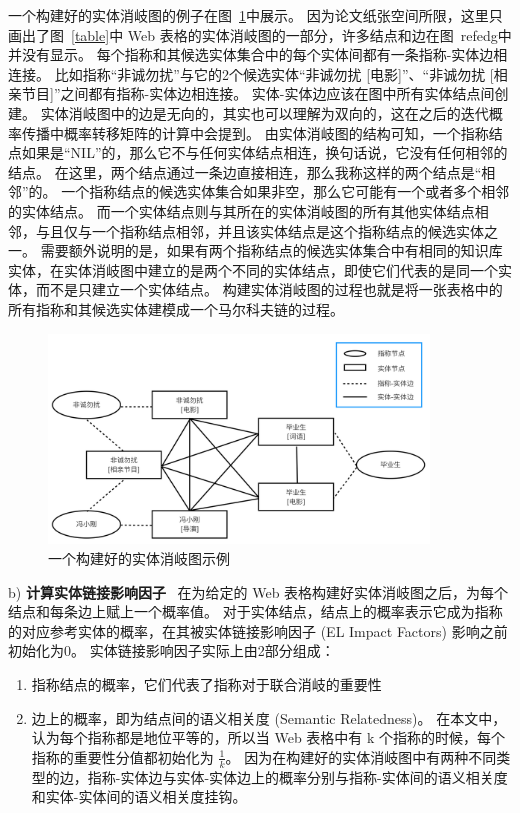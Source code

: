 一个构建好的实体消岐图的例子在图~\ref{edg}中展示。
因为论文纸张空间所限，这里只画出了图~\ref{table}中 Web 表格的实体消岐图的一部分，许多结点和边在图~ref{edg}中并没有显示。
每个指称和其候选实体集合中的每个实体间都有一条指称-实体边相连接。
比如指称``非诚勿扰''与它的2个候选实体``非诚勿扰 [电影]''、``非诚勿扰 [相亲节目]''之间都有指称-实体边相连接。
实体-实体边应该在图中所有实体结点间创建。
实体消岐图中的边是无向的，其实也可以理解为双向的，这在之后的迭代概率传播中概率转移矩阵的计算中会提到。
由实体消岐图的结构可知，一个指称结点如果是``NIL''的，那么它不与任何实体结点相连，换句话说，它没有任何相邻的结点。
在这里，两个结点通过一条边直接相连，那么我称这样的两个结点是``相邻''的。
一个指称结点的候选实体集合如果非空，那么它可能有一个或者多个相邻的实体结点。
而一个实体结点则与其所在的实体消岐图的所有其他实体结点相邻，与且仅与一个指称结点相邻，并且该实体结点是这个指称结点的候选实体之一。
需要额外说明的是，如果有两个指称结点的候选实体集合中有相同的知识库实体，在实体消岐图中建立的是两个不同的实体结点，即使它们代表的是同一个实体，而不是只建立一个实体结点。
构建实体消岐图的过程也就是将一张表格中的所有指称和其候选实体建模成一个马尔科夫链的过程。
\newline

\begin{figure}[htbp]
\centering
\includegraphics[width=0.9\textwidth]{img/edg}
\caption{一个构建好的实体消岐图示例}
\label{edg}
\end{figure}

b) \textbf{计算实体链接影响因子} \ 
在为给定的 Web 表格构建好实体消岐图之后，为每个结点和每条边上赋上一个概率值。
对于实体结点，结点上的概率表示它成为指称的对应参考实体的概率，在其被实体链接影响因子 (EL Impact Factors) 影响之前初始化为0。
实体链接影响因子实际上由2部分组成：
\begin{enumerate}[1)]
\item 指称结点的概率，它们代表了指称对于联合消岐的重要性
\item 边上的概率，即为结点间的语义相关度 (Semantic Relatedness)。
在本文中，认为每个指称都是地位平等的，所以当 Web 表格中有 k 个指称的时候，每个指称的重要性分值都初始化为 $\frac{1}{k}$。
因为在构建好的实体消岐图中有两种不同类型的边，指称-实体边与实体-实体边上的概率分别与指称-实体间的语义相关度和实体-实体间的语义相关度挂钩。
\end{enumerate}

